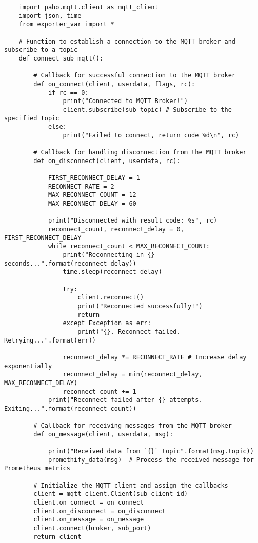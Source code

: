 \begin{verbatim}
    import paho.mqtt.client as mqtt_client
    import json, time
    from exporter_var import *

    # Function to establish a connection to the MQTT broker and subscribe to a topic
    def connect_sub_mqtt():

        # Callback for successful connection to the MQTT broker
        def on_connect(client, userdata, flags, rc):
            if rc == 0:
                print("Connected to MQTT Broker!")
                client.subscribe(sub_topic) # Subscribe to the specified topic
            else:
                print("Failed to connect, return code %d\n", rc)
        
        # Callback for handling disconnection from the MQTT broker
        def on_disconnect(client, userdata, rc):

            FIRST_RECONNECT_DELAY = 1
            RECONNECT_RATE = 2
            MAX_RECONNECT_COUNT = 12
            MAX_RECONNECT_DELAY = 60

            print("Disconnected with result code: %s", rc)
            reconnect_count, reconnect_delay = 0, FIRST_RECONNECT_DELAY
            while reconnect_count < MAX_RECONNECT_COUNT:
                print("Reconnecting in {} seconds...".format(reconnect_delay))
                time.sleep(reconnect_delay)

                try:
                    client.reconnect()
                    print("Reconnected successfully!")
                    return
                except Exception as err:
                    print("{}. Reconnect failed. Retrying...".format(err))

                reconnect_delay *= RECONNECT_RATE # Increase delay exponentially
                reconnect_delay = min(reconnect_delay, MAX_RECONNECT_DELAY)
                reconnect_count += 1
            print("Reconnect failed after {} attempts. Exiting...".format(reconnect_count))

        # Callback for receiving messages from the MQTT broker
        def on_message(client, userdata, msg):

            print("Received data from `{}` topic".format(msg.topic))
            promethify_data(msg)  # Process the received message for Prometheus metrics

        # Initialize the MQTT client and assign the callbacks
        client = mqtt_client.Client(sub_client_id)
        client.on_connect = on_connect
        client.on_disconnect = on_disconnect
        client.on_message = on_message
        client.connect(broker, sub_port)
        return client


\end{verbatim}

